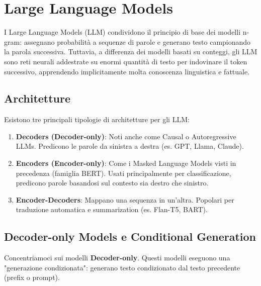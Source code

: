 
\newpage

\section{Large Language Models}

    I Large Language Models (LLM) condividono il principio di base dei modelli n-gram: assegnano probabilità a sequenze di parole e generano testo campionando la parola successiva. Tuttavia, a differenza dei modelli basati su conteggi, gli LLM sono reti neurali addestrate su enormi quantità di testo per indovinare il token successivo, apprendendo implicitamente molta conoscenza linguistica e fattuale.

    \subsection{Architetture}

        Esistono tre principali tipologie di architetture per gli LLM:
        \begin{enumerate}
            \item \textbf{Decoders (Decoder-only)}: Noti anche come Causal o Autoregressive LLMs. Predicono le parole da sinistra a destra (es. GPT, Llama, Claude).
            \item \textbf{Encoders (Encoder-only)}: Come i Masked Language Models visti in precedenza (famiglia BERT). Usati principalmente per classificazione, predicono parole basandosi sul contesto sia destro che sinistro.
            \item \textbf{Encoder-Decoders}: Mappano una sequenza in un'altra. Popolari per traduzione automatica e summarization (es. Flan-T5, BART).
        \end{enumerate}

    \subsection{Decoder-only Models e Conditional Generation}

        Concentriamoci sui modelli \textbf{Decoder-only}. Questi modelli eseguono una "generazione condizionata": generano testo condizionato dal testo precedente (prefix o prompt).

